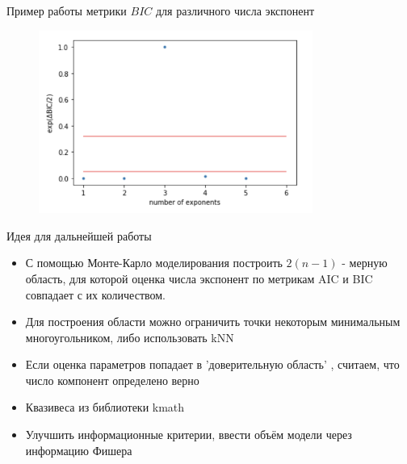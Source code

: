 \documentclass{beamer}      %
\begin{document}
    \begin{frame}
        Пример работы метрики $BIC$ для различного числа экспонент
        \begin{figure}[ht]
            \includegraphics[width=0.8\textwidth]{График2}
        \end{figure}
    \end{frame}


    \begin{frame}{Идея для дальнейшей работы}
        \begin{itemize}

            \item С помощью Монте-Карло моделирования построить
            $2(n-1)$ - мерную область, для которой оценка числа экспонент
            по метрикам AIC и BIC совпадает с их количеством.


            \item Для построения области можно ограничить точки некоторым
            минимальным многоугольником, либо использовать kNN

            \item Если оценка параметров попадает в
            'доверительную область' ,
            считаем, что число компонент определено верно
            \item Квазивеса из библиотеки kmath
            \item Улучшить информационные критерии, ввести объём модели через информацию Фишера

        \end{itemize}

    \end{frame}
\end{document}
